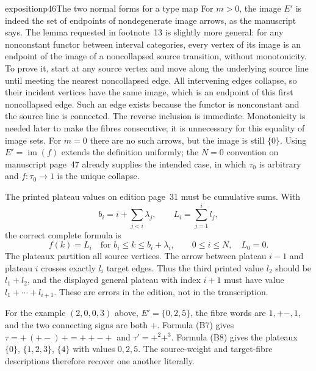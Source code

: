 \begin{dcomment}{exposition}{p46}{The two normal forms for a type map}
For $m>0$, the image $E'$ is indeed the set of endpoints of nondegenerate image arrows, as the manuscript says. The lemma requested in footnote~13 is slightly more general: for any nonconstant functor between interval categories, every vertex of its image is an endpoint of the image of a noncollapsed source transition, without monotonicity. To prove it, start at any source vertex and move along the underlying source line until meeting the nearest noncollapsed edge. All intervening edges collapse, so their incident vertices have the same image, which is an endpoint of this first noncollapsed edge. Such an edge exists because the functor is nonconstant and the source line is connected. The reverse inclusion is immediate. Monotonicity is needed later to make the fibres consecutive; it is unnecessary for this equality of image sets. For $m=0$ there are no such arrows, but the image is still $\{0\}$. Using $E'=\operatorname{im}(f)$ extends the definition uniformly; the $N=0$ convention on manuscript page~47 already supplies the intended case, in which $\tau_0$ is arbitrary and $f:\tau_0\to1$ is the unique collapse.

The printed plateau values on edition page~31 must be cumulative sums. With
\[
 b_i=i+\sum_{j<i}\lambda_j,\qquad
 L_i=\sum_{j=1}^{i}l_j,
\]
the correct complete formula is
\[
 f(k)=L_i\quad\text{for }b_i\leq k\leq b_i+\lambda_i,
 \qquad 0\leq i\leq N,\quad L_0=0.                \tag{B8}
\]
The plateaux partition all source vertices. The arrow between plateau $i-1$ and plateau $i$ crosses exactly $l_i$ target edges. Thus the third printed value $l_2$ should be $l_1+l_2$, and the displayed general plateau with index $i+1$ must have value $l_1+\cdots+l_{i+1}$. These are errors in the edition, not in the transcription.

For the example $(2,0,0,3)$ above, $E'=\{0,2,5\}$, the fibre words are $1,+-,1$, and the two connecting signs are both $+$. Formula (B7) gives $\tau=+\,(+-)\,+=++-+$ and $\tau'=+^2+^3$. Formula (B8) gives the plateaux $\{0\}$, $\{1,2,3\}$, $\{4\}$ with values $0,2,5$. The source-weight and target-fibre descriptions therefore recover one another literally.
\end{dcomment}

